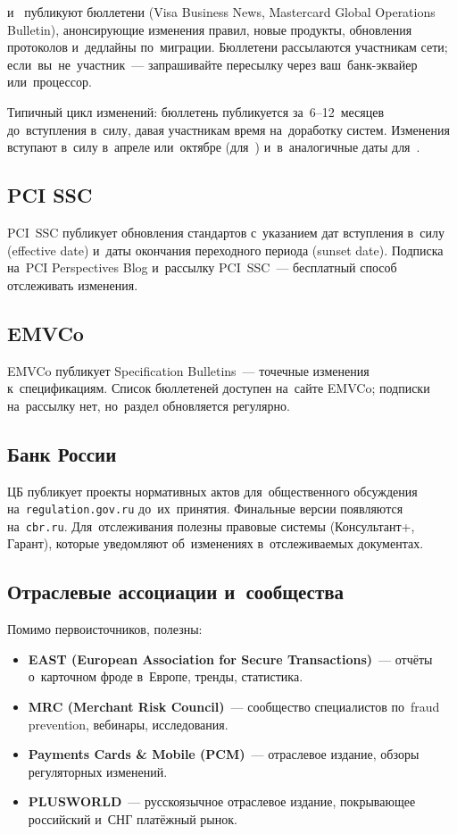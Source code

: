  и~ публикуют бюллетени
(Visa Business News, Mastercard Global Operations Bulletin),
анонсирующие изменения правил, новые продукты, обновления
протоколов и~дедлайны по~миграции. Бюллетени рассылаются
участникам сети; если~вы~не~участник~--- запрашивайте
пересылку через ваш~банк-эквайер или~процессор.

Типичный цикл изменений: бюллетень публикуется за~6--12~месяцев
до~вступления в~силу, давая участникам время на~доработку
систем. Изменения вступают в~силу в~апреле или~октябре
(для~) и~в~аналогичные даты
для~.

\subsection*{PCI SSC}

PCI~SSC публикует обновления стандартов с~указанием дат
вступления в~силу (effective date) и~даты окончания
переходного периода (sunset date). Подписка на~PCI
Perspectives Blog и~рассылку PCI~SSC~--- бесплатный
способ отслеживать изменения.

\subsection*{EMVCo}

EMVCo публикует Specification Bulletins~--- точечные изменения
к~спецификациям. Список бюллетеней доступен на~сайте EMVCo;
подписки на~рассылку нет, но~раздел обновляется регулярно.

\subsection*{Банк России}

ЦБ публикует проекты нормативных актов для~общественного
обсуждения на~\texttt{regulation.gov.ru} до~их~принятия.
Финальные версии появляются на~\texttt{cbr.ru}. Для~отслеживания
полезны правовые системы (Консультант+, Гарант), которые
уведомляют об~изменениях в~отслеживаемых документах.

\subsection*{Отраслевые ассоциации и~сообщества}

Помимо первоисточников, полезны:

\begin{itemize}
  \item \textbf{EAST (European Association for Secure Transactions)}~---
        отчёты о~карточном фроде в~Европе, тренды, статистика.
  \item \textbf{MRC (Merchant Risk Council)}~--- сообщество
        специалистов по~fraud prevention, вебинары, исследования.
  \item \textbf{Payments Cards \& Mobile (PCM)}~--- отраслевое
        издание, обзоры регуляторных изменений.
  \item \textbf{PLUSWORLD}~--- русскоязычное отраслевое издание,
        покрывающее российский и~СНГ платёжный рынок.
\end{itemize}

